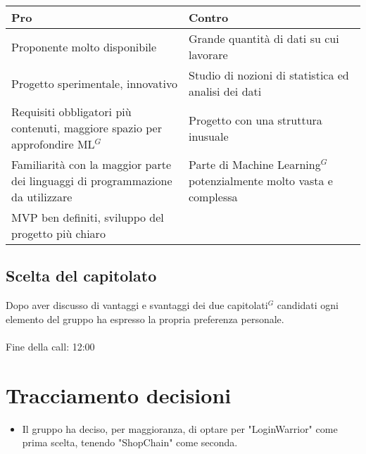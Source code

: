 \begin{tabular}{|p{0.50\linewidth}|p{0.50 \linewidth}|}
	\hline
	\textbf{Pro} & \textbf{Contro}                                                                                                                                             \\
	\hline
	Proponente molto disponibile & Grande quantità di dati su cui lavorare \\
	\hline
	Progetto sperimentale, innovativo & Studio di nozioni di statistica ed analisi dei dati \\
	\hline
	Requisiti obbligatori più contenuti, maggiore spazio per approfondire ML$^{G}$ & Progetto con una struttura inusuale\\
	\hline
	Familiarità con la maggior parte dei linguaggi di programmazione da utilizzare& Parte di Machine Learning$^{G}$ potenzialmente molto vasta e complessa\\
	\hline
	MVP ben definiti, sviluppo del progetto più chiaro&\\
	\hline
\end{tabular}
\subsection{Scelta del capitolato}
Dopo aver discusso di vantaggi e svantaggi dei due capitolati$^{G}$ candidati ogni elemento del gruppo ha espresso la propria preferenza personale.\\
\\\noindent
Fine della call: 12:00

\section{Tracciamento decisioni}
\begin{itemize}
	\item Il gruppo ha deciso, per maggioranza, di optare per "LoginWarrior" come prima scelta, tenendo "ShopChain" come seconda.
\end{itemize}
